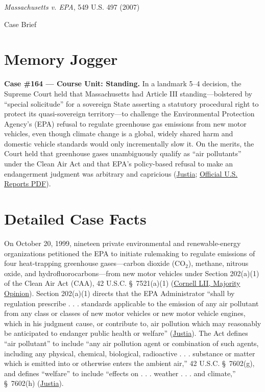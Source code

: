 \documentclass[12pt]{article}
\begin{document}
\begin{center}
{\LARGE \textit{Massachusetts v. EPA}, 549 U.S. 497 (2007)\par}
\vspace{0.8em}
{\large Case Brief\par}
\end{center}
\vspace{1em}

\section{Memory Jogger}

\textbf{Case \#164 --- Course Unit: Standing.} In a landmark 5--4 decision, the Supreme Court held that Massachusetts had Article III standing---bolstered by ``special solicitude'' for a sovereign State asserting a statutory procedural right to protect its quasi-sovereign territory---to challenge the Environmental Protection Agency's (EPA) refusal to regulate greenhouse gas emissions from new motor vehicles, even though climate change is a global, widely shared harm and domestic vehicle standards would only incrementally slow it. On the merits, the Court held that greenhouse gases unambiguously qualify as ``air pollutants'' under the Clean Air Act and that EPA's policy-based refusal to make an endangerment judgment was arbitrary and capricious (\href{https://supreme.justia.com/cases/federal/us/549/497/}{Justia}; \href{https://tile.loc.gov/storage-services/service/ll/usrep/usrep549/usrep549497/usrep549497.pdf}{Official U.S. Reports PDF}).

\section{Detailed Case Facts}

On October 20, 1999, nineteen private environmental and renewable-energy organizations petitioned the EPA to initiate rulemaking to regulate emissions of four heat-trapping greenhouse gases---carbon dioxide ($\mathrm{CO_2}$), methane, nitrous oxide, and hydrofluorocarbons---from new motor vehicles under Section 202(a)(1) of the Clean Air Act (CAA), 42 U.S.C. \S\ 7521(a)(1) (\href{https://www.law.cornell.edu/supct/html/05-1120.ZO.html}{Cornell LII, Majority Opinion}). Section 202(a)(1) directs that the EPA Administrator ``shall by regulation prescribe . . . standards applicable to the emission of any air pollutant from any class or classes of new motor vehicles or new motor vehicle engines, which in his judgment cause, or contribute to, air pollution which may reasonably be anticipated to endanger public health or welfare'' (\href{https://supreme.justia.com/cases/federal/us/549/497/}{Justia}). The Act defines ``air pollutant'' to include ``any air pollution agent or combination of such agents, including any physical, chemical, biological, radioactive . . . substance or matter which is emitted into or otherwise enters the ambient air,'' 42 U.S.C. \S\ 7602(g), and defines ``welfare'' to include ``effects on . . . weather . . . and climate,'' \S\ 7602(h) (\href{https://supreme.justia.com/cases/federal/us/549/497/}{Justia}).
\end{document}
